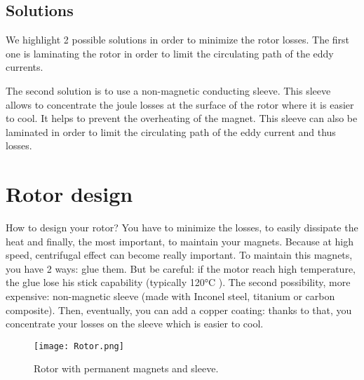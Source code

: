 \subsection{Solutions}
We highlight 2 possible solutions in order to minimize the rotor losses. The first one is laminating the rotor in order to limit the circulating path of the eddy currents.

The second solution is to use a non-magnetic conducting sleeve. This sleeve allows to concentrate the joule losses at the surface of the rotor where it is easier to cool. It helps to prevent the overheating of the magnet. This sleeve can also be laminated in order to limit the circulating path of the eddy current and thus losses.

\section{Rotor design}
How to design your rotor? You have to minimize the losses, to easily dissipate the heat and finally, the most important, to maintain your magnets. Because at high speed, centrifugal effect can become really important. To maintain this magnets, you have 2 ways: 
glue them. But be careful: if the motor reach high temperature, the glue lose his stick capability (typically 120°C ).
The second possibility, more expensive: non-magnetic sleeve (made with Inconel steel, titanium or carbon composite). Then, eventually, you can add a copper coating: thanks to that, you concentrate your losses on the sleeve which is easier to cool.

\begin{figure}[H]
    \centering
    \texttt{[image: Rotor.png]}
    \caption{Rotor with permanent magnets and sleeve.}
    \label{fig:Rotor}
\end{figure}


